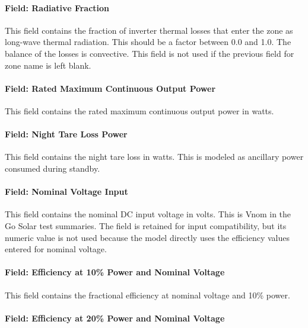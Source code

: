 \paragraph{Field: Radiative Fraction}\label{field-radiative-fraction-3}

This field contains the fraction of inverter thermal losses that enter the zone as long-wave thermal radiation. This should be a factor between 0.0 and 1.0. The balance of the losses is convective. This field is not used if the previous field for zone name is left blank.

\paragraph{Field: Rated Maximum Continuous Output Power}\label{field-rated-maximum-continuous-output-power}

This field contains the rated maximum continuous output power in watts.

\paragraph{Field: Night Tare Loss Power}\label{field-night-tare-loss-power}

This field contains the night tare loss in watts. This is modeled as ancillary power consumed during standby.

\paragraph{Field: Nominal Voltage Input}\label{field-nominal-voltage-input}

This field contains the nominal DC input voltage in volts. This is Vnom in the Go Solar test summaries. The field is retained for input compatibility, but its numeric value is not used because the model directly uses the efficiency values entered for nominal voltage.

\paragraph{Field: Efficiency at 10\% Power and Nominal Voltage}\label{field-efficiency-at-10-power-and-nominal-voltage}

This field contains the fractional efficiency at nominal voltage and 10\% power.

\paragraph{Field: Efficiency at 20\% Power and Nominal Voltage}\label{field-efficiency-at-20-power-and-nominal-voltage}

